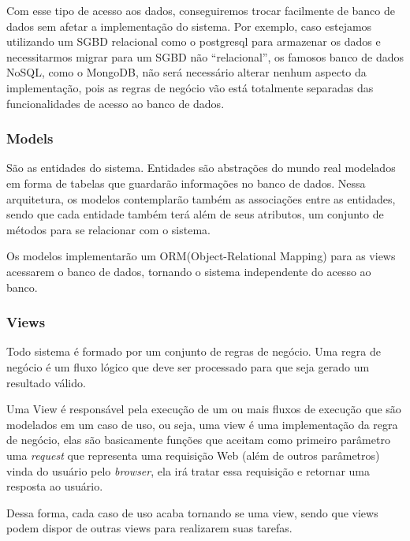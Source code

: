 Com esse tipo de acesso aos dados, conseguiremos trocar facilmente de banco de 
dados sem afetar a implementação do sistema. Por exemplo, caso estejamos 
utilizando um SGBD relacional como o postgresql para armazenar os dados e 
necessitarmos migrar para um SGBD não “relacional”, os famosos banco de dados 
NoSQL, como o MongoDB, não será necessário alterar nenhum aspecto da 
implementação, pois as regras de negócio vão está totalmente separadas das 
funcionalidades de acesso ao banco de dados.

\subsubsection{Models}
São as entidades do sistema. Entidades são abstrações do mundo real modelados em 
forma de tabelas que guardarão informações no banco de dados. Nessa arquitetura, 
os modelos contemplarão também as associações entre as entidades, sendo que cada 
entidade também terá al\'em de seus atributos, um conjunto de métodos para se 
relacionar com o sistema.

Os modelos implementarão um ORM(Object-Relational Mapping) para as views 
acessarem o banco de dados, tornando o sistema independente do acesso ao banco. 

\subsubsection{Views}
Todo sistema é formado por um conjunto de regras de negócio. Uma regra de 
neg\'ocio é um fluxo lógico que deve ser processado para que seja gerado um resultado 
válido.

Uma View é responsável pela execução de um ou mais fluxos de execução que são 
modelados em um caso de uso, ou seja, uma view é uma implementação da regra de 
neg\'ocio, elas são basicamente funções que aceitam como primeiro parâmetro uma 
\textit{request} que representa uma requisição Web (além de outros parâmetros) 
vinda do usuário pelo \textit{browser}, ela irá tratar essa requisição e 
retornar uma resposta ao usuário.

Dessa forma, cada caso de uso acaba tornando se uma view, sendo que views podem 
dispor de outras views para realizarem suas tarefas. 

